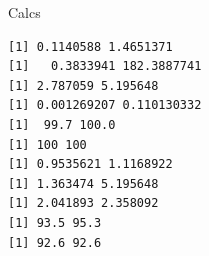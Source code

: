 \documentclass[11pt]{article}\usepackage[]{graphicx}\usepackage[]{color}
\makeatletter
\newenvironment{kframe}{%
 \def\at@end@of@kframe{}%
 \ifinner\ifhmode%
  \def\at@end@of@kframe{\end{minipage}}%
  \begin{minipage}{\columnwidth}%
 \fi\fi%
 \def\FrameCommand##1{\hskip\@totalleftmargin \hskip-\fboxsep
 \colorbox{shadecolor}{##1}\hskip-\fboxsep
     \hskip-\linewidth \hskip-\@totalleftmargin \hskip\columnwidth}%
 \MakeFramed {\advance\hsize-\width
   \@totalleftmargin\z@ \linewidth\hsize
   \@setminipage}}%
 {\par\unskip\endMakeFramed%
 \at@end@of@kframe}
\newenvironment{knitrout}{}{} %
\makeatother
\begin{document}
Calcs
\begin{knitrout}
\color{fgcolor}\begin{kframe}
\begin{verbatim}
[1] 0.1140588 1.4651371
[1]   0.3833941 182.3887741
[1] 2.787059 5.195648
[1] 0.001269207 0.110130332
[1]  99.7 100.0
[1] 100 100
[1] 0.9535621 1.1168922
[1] 1.363474 5.195648
[1] 2.041893 2.358092
[1] 93.5 95.3
[1] 92.6 92.6
\end{verbatim}
\end{kframe}
\end{knitrout}
\end{document}
